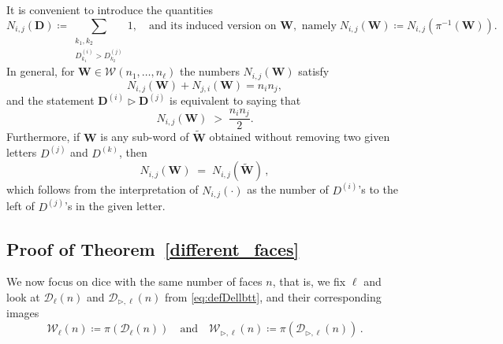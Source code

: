 \documentclass[reqno,a4paper,11pt]{amsart}
\newcommand{\btt}{\triangleright}
\theoremstyle{remark}
\newcommand{\mc}[1]{{\mathcal #1}}
\newcommand{\mb}[1]{{\mathbf #1}}
\numberwithin{equation}{section}
\begin{document}
It is convenient to introduce the quantities
\begin{equation}\label{eq:deffNijD}
N_{i,j}(\mb D)\coloneqq \sum_{\substack{ k_1,k_2 \\ D_{k_1}^{(i)}>D^{(j)}_{k_2}}} 1, \quad \text{and its induced version on }\mb W,\text{ namely} \; N_{i,j}(\mb W)\coloneqq N_{i,j}(\pi^{-1}(\mb W)).
\end{equation}
%
In general, for $\mb W\in \mc W(n_1,\hdots,n_\ell)$ the numbers $N_{i,j}(\mb W)$ satisfy
%
\begin{equation}\label{eq:NijNjideterm}
N_{i,j}(\mb W)+N_{j,i}(\mb W)=n_in_j,
\end{equation}
%
and the statement $\mb D^{(i)}\btt \mb D^{(j)}$ is equivalent to saying that
%
\begin{equation}\label{eq:ineqNijintransitivity}
N_{i,j}(\mb W)\;>\;\frac{n_in_j}{2}.
\end{equation}
%
Furthermore, if $\mb W$ is any sub-word of $\widetilde{\mb W}$ obtained without removing two given letters $D^{(j)}$ and $D^{(k)}$, then
%
\begin{equation}\label{eq:Nijsubword}
N_{i,j}(\mb W)\;=\;N_{i,j}(\widetilde{\mb W})\,,
\end{equation}
%
which follows from the interpretation of $N_{i,j}(\cdot)$ as the number of $D^{(i)}$'s to the left of $D^{(j)}$'s in the given letter.

\subsection{Proof of Theorem~\ref{different_faces}}\hfill

We now focus on dice with the same number of faces $n$, that is, we fix $\ell$ and look at $\mc D_\ell(n)$ and $\mc D_{\btt, \ell}(n)$ from \eqref{eq:defDellbtt}, and their corresponding images
%
$$
\mc W_\ell(n)\coloneqq \pi(\mc D_\ell(n)) \quad \text{and}\quad \mc W_{\btt,\ell}(n)\coloneqq \pi(\mc D_{\btt,\ell}(n))\,.
$$
\end{document}
